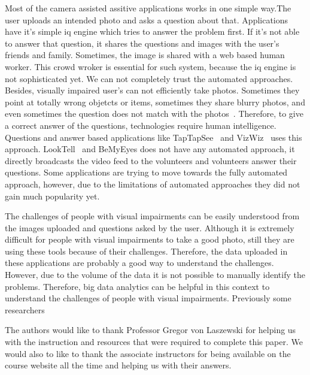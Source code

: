 \documentclass[sigconf]{acmart}
\begin{document}
Most of the camera assisted assitive applications works in one simple way.The user uploads an intended photo and asks a question about that. Applications have it's simple iq engine which tries to answer the problem first. If it's not able to answer that question, it shares the questions and images with the user's friends and family. Sometimes, the image is shared with a web based human worker. This crowd wroker is essential for such system, because the iq engine is not sophisticated yet. We can not completely trust the automated approaches.  Besides, visually impaired user's can not efficiently take photos. Sometimes they point at totally wrong objetcts or items, sometimes they share blurry photos, and even sometimes the question does not match with the photos~\cite{Jayant:2011,Bigham:2010,Harada:2013}. Therefore, to give a correct answer of the questions, technologies require human intelligence. Questions and answer based applications like TapTapSee~\cite{taptapsee} and VizWiz~\cite{Bigham:2010} uses this approach. LookTell~\cite{looktel} and BeMyEyes does not have any automated approach, it directly broadcasts the video feed to the volunteers and volunteers answer their questions. Some applications are trying to move towards the fully automated approach, however, due to the limitations of automated approaches they did not gain much popularity yet.

The challenges of people with visual impairments can be easily understood from the images uploaded and questions asked by the user. Although it is extremely difficult for people with visual impairments to take a good photo, still they are using these tools because of their challenges. Therefore, the data uploaded in these applications are probably a good way to understand the challenges. However, due to the volume of the data it is not possible to manually identify the problems. Therefore, big data analytics can be helpful in this context to understand the challenges of people with visual impairments. Previously some researchers 



\begin{acks}

The authors would like to thank Professor Gregor von Laszewski for helping us with the instruction and resources that were required to complete this paper. We would also to like to thank the associate instructors for being available on the course website all the time and helping us with their answers.

\end{acks}
\end{document}
